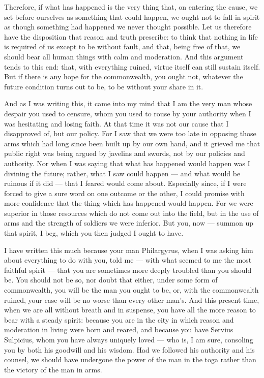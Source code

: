 Therefore, if what has happened is the very thing that, on entering the cause, we set before ourselves as something that could happen, we ought not to fall in spirit as though something had happened we never thought possible. Let us therefore have the disposition that reason and truth prescribe: to think that nothing in life is required of us except to be without fault, and that, being free of that, we should bear all human things with calm and moderation. And this argument tends to this end: that, with everything ruined, virtue itself can still sustain itself. But if there is any hope for the commonwealth, you ought not, whatever the future condition turns out to be, to be without your share in it.

 And as I was writing this, it came into my mind that I am the very man whose despair you used to censure, whom you used to rouse by your authority when I was hesitating and losing faith. At that time it was not our cause that I disapproved of, but our policy. For I saw that we were too late in opposing those arms which had long since been built up by our own hand, and it grieved me that public right was being argued by javelins and swords, not by our policies and authority. Nor when I was saying that what has happened would happen was I divining the future; rather, what I saw could happen --- and what would be ruinous if it did --- that I feared would come about. Especially since, if I were forced to give a sure word on one outcome or the other, I could promise with more confidence that the thing which has happened would happen. For we were superior in those resources which do not come out into the field, but in the use of arms and the strength of soldiers we were inferior. But you, now --- summon up that spirit, I beg, which you then judged I ought to have.

 I have written this much because your man Philargyrus, when I was asking him about everything to do with you, told me --- with what seemed to me the most faithful spirit --- that you are sometimes more deeply troubled than you should be. You should not be so, nor doubt that either, under some form of commonwealth, you will be the man you ought to be, or, with the commonwealth ruined, your case will be no worse than every other man's. And this present time, when we are all without breath and in suspense, you have all the more reason to bear with a steady spirit: because you are in the city in which reason and moderation in living were born and reared, and because you have Servius Sulpicius, whom you have always uniquely loved --- who is, I am sure, consoling you by both his goodwill and his wisdom. Had we followed his authority and his counsel, we should have undergone the power of the man in the toga rather than the victory of the man in arms.

